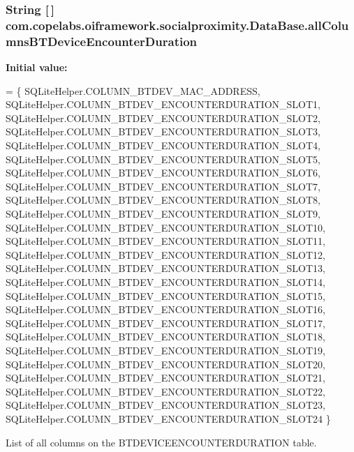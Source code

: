 \subsubsection[{all\+Columns\+B\+T\+Device\+Encounter\+Duration}]{\setlength{\rightskip}{0pt plus 5cm}String \mbox{[}$\,$\mbox{]} com.\+copelabs.\+oiframework.\+socialproximity.\+Data\+Base.\+all\+Columns\+B\+T\+Device\+Encounter\+Duration\hspace{0.3cm}{\ttfamily [private]}}\label{classcom_1_1copelabs_1_1oiframework_1_1socialproximity_1_1_data_base_a2d4588f35ae5dbb0fd852124e2960c46}
{\bfseries Initial value\+:}
\begin{DoxyCode}
= \{ 
        SQLiteHelper.COLUMN\_BTDEV\_MAC\_ADDRESS,
        SQLiteHelper.COLUMN\_BTDEV\_ENCOUNTERDURATION\_SLOT1,
        SQLiteHelper.COLUMN\_BTDEV\_ENCOUNTERDURATION\_SLOT2,
        SQLiteHelper.COLUMN\_BTDEV\_ENCOUNTERDURATION\_SLOT3,
        SQLiteHelper.COLUMN\_BTDEV\_ENCOUNTERDURATION\_SLOT4,
        SQLiteHelper.COLUMN\_BTDEV\_ENCOUNTERDURATION\_SLOT5,
        SQLiteHelper.COLUMN\_BTDEV\_ENCOUNTERDURATION\_SLOT6,
        SQLiteHelper.COLUMN\_BTDEV\_ENCOUNTERDURATION\_SLOT7,
        SQLiteHelper.COLUMN\_BTDEV\_ENCOUNTERDURATION\_SLOT8,
        SQLiteHelper.COLUMN\_BTDEV\_ENCOUNTERDURATION\_SLOT9,
        SQLiteHelper.COLUMN\_BTDEV\_ENCOUNTERDURATION\_SLOT10,
        SQLiteHelper.COLUMN\_BTDEV\_ENCOUNTERDURATION\_SLOT11,
        SQLiteHelper.COLUMN\_BTDEV\_ENCOUNTERDURATION\_SLOT12,
        SQLiteHelper.COLUMN\_BTDEV\_ENCOUNTERDURATION\_SLOT13,
        SQLiteHelper.COLUMN\_BTDEV\_ENCOUNTERDURATION\_SLOT14,
        SQLiteHelper.COLUMN\_BTDEV\_ENCOUNTERDURATION\_SLOT15,
        SQLiteHelper.COLUMN\_BTDEV\_ENCOUNTERDURATION\_SLOT16,
        SQLiteHelper.COLUMN\_BTDEV\_ENCOUNTERDURATION\_SLOT17,
        SQLiteHelper.COLUMN\_BTDEV\_ENCOUNTERDURATION\_SLOT18,
        SQLiteHelper.COLUMN\_BTDEV\_ENCOUNTERDURATION\_SLOT19,
        SQLiteHelper.COLUMN\_BTDEV\_ENCOUNTERDURATION\_SLOT20,
        SQLiteHelper.COLUMN\_BTDEV\_ENCOUNTERDURATION\_SLOT21,
        SQLiteHelper.COLUMN\_BTDEV\_ENCOUNTERDURATION\_SLOT22,
        SQLiteHelper.COLUMN\_BTDEV\_ENCOUNTERDURATION\_SLOT23,
        SQLiteHelper.COLUMN\_BTDEV\_ENCOUNTERDURATION\_SLOT24
    \}
\end{DoxyCode}
List of all columns on the B\+T\+D\+E\+V\+I\+C\+E\+E\+N\+C\+O\+U\+N\+T\+E\+R\+D\+U\+R\+A\+T\+I\+O\+N table. \hypertarget{classcom_1_1copelabs_1_1oiframework_1_1socialproximity_1_1_data_base_aa4b93c819020054cb701c58f05596ccd}{}
